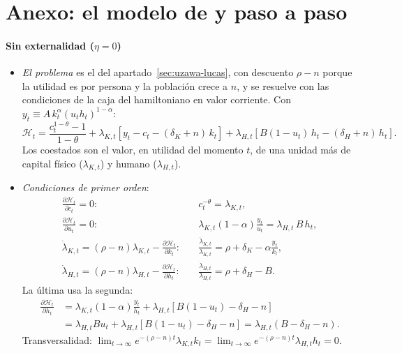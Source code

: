 \documentclass[11pt]{article}
\begin{document}
\section{Anexo: el modelo de  y  paso a paso}\label{anexo:uzawa-lucas}

\paragraph{Sin externalidad ($\eta=0$)}

\begin{itemize}
\item \emph{El problema} es el del apartado~\ref{sec:uzawa-lucas}, con descuento $\rho-n$ porque la utilidad es por persona y la población crece a $n$, y se resuelve con las condiciones de la caja del hamiltoniano en valor corriente. Con $y_t\equiv A\,k_t^{\alpha}(u_th_t)^{1-\alpha}$:
  \[\mathcal H_t=\frac{c_t^{1-\theta}-1}{1-\theta}+\lambda_{K,t}\left[y_t-c_t-(\delta_K+n)\,k_t\right]+\lambda_{H,t}\left[B(1-u_t)\,h_t-(\delta_H+n)\,h_t\right].\]
  Los coestados son el valor, en utilidad del momento $t$, de una unidad más de capital físico ($\lambda_{K,t}$) y humano ($\lambda_{H,t}$).
\item \emph{Condiciones de primer orden}:
  \begin{align*}
  \frac{\partial\mathcal H_t}{\partial c_t}=0:&\quad c_t^{-\theta}=\lambda_{K,t},\\
  \frac{\partial\mathcal H_t}{\partial u_t}=0:&\quad \lambda_{K,t}(1-\alpha)\frac{y_t}{u_t}=\lambda_{H,t}\,B\,h_t,\\
  \dot\lambda_{K,t}=(\rho-n)\lambda_{K,t}-\frac{\partial\mathcal H_t}{\partial k_t}:&\quad \frac{\dot\lambda_{K,t}}{\lambda_{K,t}}=\rho+\delta_K-\alpha\frac{y_t}{k_t},\\
  \dot\lambda_{H,t}=(\rho-n)\lambda_{H,t}-\frac{\partial\mathcal H_t}{\partial h_t}:&\quad \frac{\dot\lambda_{H,t}}{\lambda_{H,t}}=\rho+\delta_H-B.
  \end{align*}
  La última usa la segunda:
  \begin{align*}
  \frac{\partial\mathcal H_t}{\partial h_t}&=\lambda_{K,t}(1-\alpha)\frac{y_t}{h_t}+\lambda_{H,t}\left[B(1-u_t)-\delta_H-n\right]\\
  &=\lambda_{H,t}Bu_t+\lambda_{H,t}\left[B(1-u_t)-\delta_H-n\right]=\lambda_{H,t}(B-\delta_H-n).
  \end{align*}
  Transversalidad: $\lim_{t\to\infty}e^{-(\rho-n)t}\lambda_{K,t}k_t=\lim_{t\to\infty}e^{-(\rho-n)t}\lambda_{H,t}h_t=0$.

\end{itemize}
\end{document}
